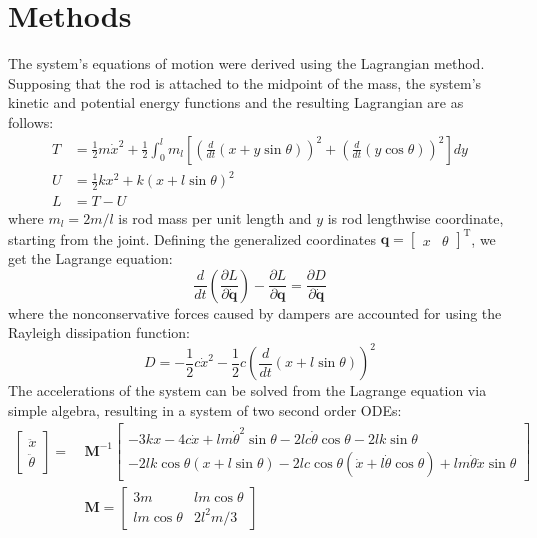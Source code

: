\documentclass{article}
\begin{document}
	\section*{Methods}
	The system's equations of motion were derived using the Lagrangian method. Supposing that the rod is attached to the midpoint of the mass, the system's kinetic and potential energy functions and the resulting Lagrangian are as follows:
	\begin{equation}
		\begin{aligned}
		T &= \frac{1}{2} m \dot{x}^2 + \frac{1}{2} \int_{0}^{l} m_l \left[ \left( \frac{d}{dt} (x + y \sin \theta) \right)^2 + \left( \frac{d}{dt} (y \cos \theta) \right)^2 \right] dy \\
		U &= \frac{1}{2} k x^2 + k (x + l \sin \theta)^2 \\
		L &= T - U
		\end{aligned}
	\end{equation}
	where $m_l = 2 m / l$ is rod mass per unit length and $y$ is rod lengthwise coordinate, starting from the joint. Defining the generalized coordinates $\bm{q} = \begin{bmatrix} x & \theta \end{bmatrix}^\text{T}$, we get the Lagrange equation:
	\begin{equation}
		\frac{d}{dt}\left(\frac{\partial L}{\partial \dot{\bm{q}}}\right) - \frac{\partial L}{\partial \bm{q}} = \frac{\partial D}{\partial \dot{\bm{q}}}
	\end{equation}
	where the nonconservative forces caused by dampers are accounted for using the Rayleigh dissipation function:
	\begin{equation}
	D = - \frac{1}{2} c \dot{x}^2 - \frac{1}{2} c \left(\frac{d}{dt} (x + l \sin \theta) \right)^2
	\end{equation}	
	The accelerations of the system can be solved from the Lagrange equation via simple algebra, resulting in a system of two second order ODEs:	
	\begin{equation}
		\begin{aligned}
		\begin{bmatrix}
		\ddot{x} \\ \ddot{\theta}
		\end{bmatrix} =
		~&\mathbf{M}^{-1}
		\begin{bmatrix}
		- 3 k x - 4 c \dot{x} + l m \dot{\theta}^2 \sin \theta - 2 l c \dot{\theta} \cos \theta  - 2  l k \sin \theta\\
		- 2 l k \cos \theta (x + l \sin \theta) - 2 l c \cos \theta (\dot{x} + l \dot{\theta} \cos \theta) + l m \dot{\theta} \dot{x} \sin \theta
		\end{bmatrix}\\
		& \mathbf{M} =
		\begin{bmatrix}
		3 m & l m \cos \theta \\
		l m \cos \theta & 2 l^2 m / 3
		\end{bmatrix}
		\end{aligned}
	\end{equation}
\end{document}
